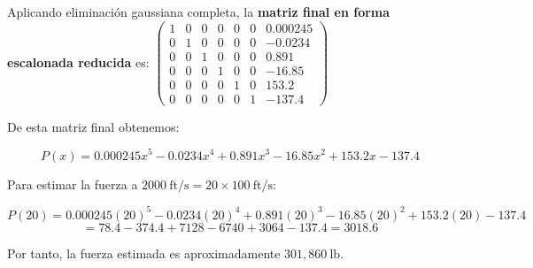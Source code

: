 \begin{prob}
\begin{myproof}
Aplicando eliminación gaussiana completa, la \textbf{matriz final en forma escalonada reducida} es:
$\left(\begin{array}{cccccc|c}
1 & 0 & 0 & 0 & 0 & 0 & 0.000245 \\
0 & 1 & 0 & 0 & 0 & 0 & -0.0234 \\
0 & 0 & 1 & 0 & 0 & 0 & 0.891 \\
0 & 0 & 0 & 1 & 0 & 0 & -16.85 \\
0 & 0 & 0 & 0 & 1 & 0 & 153.2 \\
0 & 0 & 0 & 0 & 0 & 1 & -137.4
\end{array}\right)$

De esta matriz final obtenemos:

$$P(x) = 0.000245x^5 - 0.0234x^4 + 0.891x^3 - 16.85x^2 + 153.2x - 137.4$$

Para estimar la fuerza a $2000\ \text{ft}/\text{s} = 20 \times 100\ \text{ft}/\text{s}$:

$$P(20) = 0.000245(20)^5 - 0.0234(20)^4 + 0.891(20)^3 - 16.85(20)^2 + 153.2(20) - 137.4$$
$$= 78.4 - 374.4 + 7128 - 6740 + 3064 - 137.4 = 3018.6$$

Por tanto, la fuerza estimada es aproximadamente $301,860\ \text{lb}$.
\end{myproof}
\end{prob}

